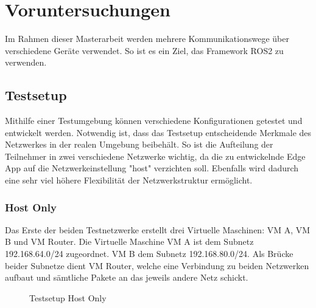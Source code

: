 \chapter{Voruntersuchungen}
\label{Voruntersuchungen}
	Im Rahmen dieser Masterarbeit werden mehrere Kommunikationswege über verschiedene Geräte verwendet.
	So ist es ein Ziel, das Framework ROS2 zu verwenden.
		
	\section{Testsetup}
	\label{Voruntersuchungen:Testsetup}
		Mithilfe einer Testumgebung können verschiedene Konfigurationen getestet und entwickelt werden.
		Notwendig ist, dass das Testsetup entscheidende Merkmale des Netzwerkes in der realen Umgebung beibehält.
		So ist die Aufteilung der Teilnehmer in zwei verschiedene Netzwerke wichtig, da die zu entwickelnde Edge App auf die Netzwerkeinstellung "host" verzichten soll.
		Ebenfalls wird dadurch eine sehr viel höhere Flexibilität der Netzwerkstruktur ermöglicht. 
				
		\subsection{Host Only}
		\label{Voruntersuchungen:Testsetup:HostOnly}
			Das Erste der beiden Testnetzwerke erstellt drei Virtuelle Maschinen: VM A, VM B und VM Router.
			Die Virtuelle Maschine VM A ist dem Subnetz 192.168.64.0/24 zugeordnet. VM B dem Subnetz 192.168.80.0/24.
			Als Brücke beider Subnetze dient VM Router, welche eine Verbindung zu beiden Netzwerken aufbaut und sämtliche Pakete an das jeweils andere Netz schickt.
			
			\begin{figure}[H]
				\centering
				
				\caption{Testsetup Host Only}
				\label{fig:Voruntersuchungen:Testsetup:HostOnly:Setup}					
			\end{figure}
			
